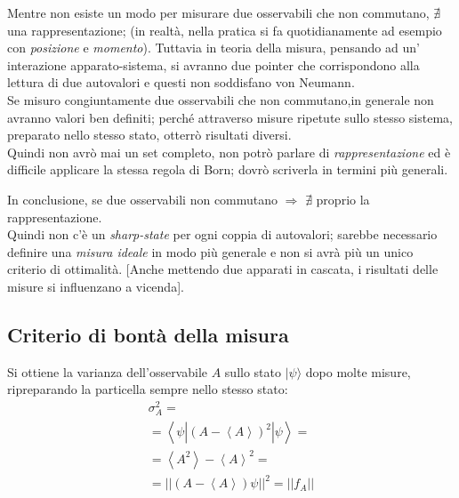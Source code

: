 Mentre non esiste un modo per misurare due osservabili che non commutano, $\nexists$ una rappresentazione; (in realtà, nella pratica si fa quotidianamente ad esempio con \emph{posizione} e \emph{momento}). Tuttavia in teoria della misura, pensando ad un' interazione apparato-sistema, si avranno due pointer che corrispondono alla lettura di due autovalori e questi non soddisfano von Neumann. \\
Se misuro congiuntamente due osservabili che non commutano,in generale non avranno valori ben definiti; perché attraverso misure ripetute sullo stesso sistema, preparato nello stesso stato, otterrò risultati diversi. \\
Quindi non avrò mai un set completo, non potrò parlare di \emph{rappresentazione} ed è difficile applicare la stessa regola di Born; dovrò scriverla in termini più generali.

In conclusione, se due osservabili non commutano $\Longrightarrow$ $\nexists$ proprio la rappresentazione. \\
Quindi non c'è un \emph{sharp-state} per ogni coppia di autovalori; sarebbe necessario definire una \emph{misura ideale} in modo più generale e non si avrà più un unico criterio di ottimalità.
[Anche mettendo due apparati in cascata, i risultati delle misure si influenzano a vicenda].

\subsection{Criterio di bontà della misura}%
Si ottiene la varianza dell'osservabile $A$ sullo stato $|\psi\rangle$ dopo molte misure, ripreparando la particella sempre nello stesso stato:
\begin{equation}\begin{split}
\sigma _A^2=\\
=\left\langle \psi |\left(A-\left\langle A \right\rangle\right)^2|\psi  \right\rangle=\\
=\left\langle A^2 \right\rangle-\left\langle A \right\rangle^2=\\
=||\left(A-\left\langle A \right\rangle\right)\psi ||^2=||f_A||
\end{split}\end{equation}

